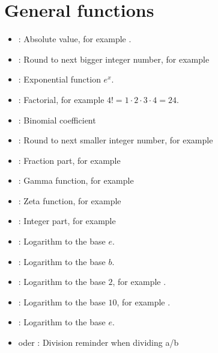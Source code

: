 \chapter{General functions}

\begin{itemize}

\item
{}:
Absolute value, for example .

\item
{}:
Round to next bigger integer number, for example 

\item
{}:
Exponential function $e^x$.

\item
{}:
Factorial, for example $4!=1\cdot2\cdot3\cdot4=24$.

\item
{}:
Binomial coefficient

\item
{}:
Round to next smaller integer number, for example 

\item
{}:
Fraction part, for example 

\item
{}:
Gamma function, for example 

\item
{}:
Zeta function, for example 

\item
{}:
Integer part, for example 

\item
{}:
Logarithm to the base $e$.

\item
{}:
Logarithm to the base $b$.

\item
{}:
Logarithm to the base $2$, for example .

\item
{}:
Logarithm to the base $10$, for example .

\item
{}:
Logarithm to the base $e$.

\item
{} oder :
Division reminder when dividing a/b


\end{itemize}
